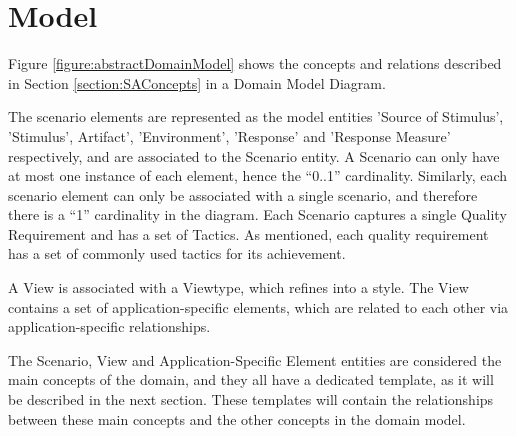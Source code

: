 \section{Model}
\label{section:model}
Figure \ref{figure:abstractDomainModel} shows the concepts and relations described in Section \ref{section:SAConcepts} in a Domain Model Diagram. 

The scenario elements are represented as the model entities 'Source of Stimulus', 'Stimulus', Artifact', 'Environment', 'Response' and 'Response Measure' respectively, and are associated to the Scenario entity. A Scenario can only have at most one instance of each element, hence the ``0..1'' cardinality. Similarly, each scenario element can only be associated with a single scenario, and therefore there is a ``1'' cardinality in the diagram. Each Scenario captures a single Quality Requirement and has a set of Tactics. As mentioned, each quality requirement has a set of commonly used tactics for its achievement.

A View is associated with a Viewtype, which refines into a style. The View contains a set of application-specific elements, which are related to each other via application-specific relationships.

The Scenario, View and Application-Specific Element entities are considered the main concepts of the domain, and they all have a dedicated template, as it will be described in the next section. These templates will contain the relationships between these main concepts and the other concepts in the domain model.

